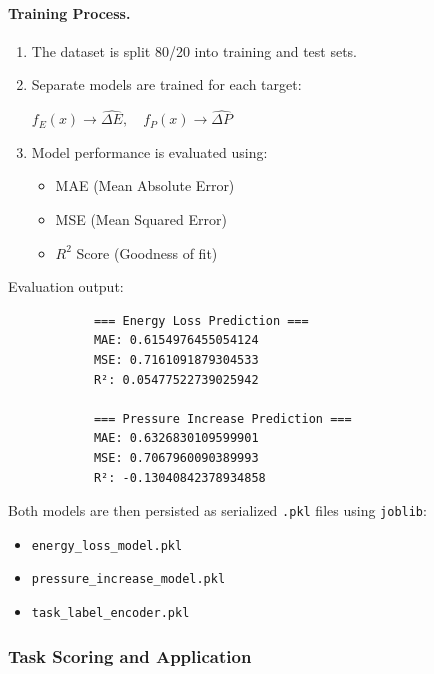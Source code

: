\documentclass[12pt, a4paper]{article}
\begin{document}
            \paragraph{Training Process.}
            \begin{enumerate}
                \item The dataset is split 80/20 into training and test sets.
                \item Separate models are trained for each target:
                \begin{center}
                    $f_E(x) \rightarrow \widehat{\Delta E}, \quad f_P(x) \rightarrow \widehat{\Delta P}$
                \end{center}
                \item Model performance is evaluated using:
                \begin{itemize}
                    \item MAE (Mean Absolute Error)
                    \item MSE (Mean Squared Error)
                    \item $R^2$ Score (Goodness of fit)
                \end{itemize}
            \end{enumerate}
    
            Evaluation output:
    
            \begin{verbatim}
            === Energy Loss Prediction ===
            MAE: 0.6154976455054124
            MSE: 0.7161091879304533
            R²: 0.05477522739025942
    
            === Pressure Increase Prediction ===
            MAE: 0.6326830109599901
            MSE: 0.7067960090389993
            R²: -0.13040842378934858
            \end{verbatim}
    
            Both models are then persisted as serialized \texttt{.pkl} files using \texttt{joblib}:
            \begin{itemize}
                \item \texttt{energy\_loss\_model.pkl}
                \item \texttt{pressure\_increase\_model.pkl}
                \item \texttt{task\_label\_encoder.pkl}
            \end{itemize}
    
        \subsubsection{Task Scoring and Application}
    
\end{document}
